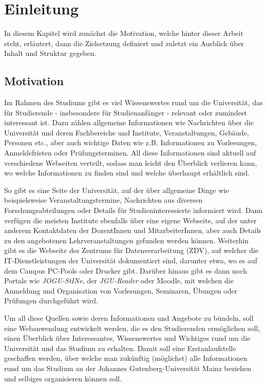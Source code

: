 %
\chapter{Einleitung}
\label{sec:intro}

In diesem Kapitel wird zunächst die Motivation, welche hinter dieser Arbeit steht, erläutert, dann die Zielsetzung definiert und zuletzt ein Ausblick über Inhalt und Struktur gegeben.

\label{sec:intro:motivation}
\section{Motivation}

Im Rahmen des Studiums gibt es viel Wissenswertes rund um die Universität, das für Studierende - insbesondere für Studienanfänger - relevant oder zumindest interessant ist. Dazu zählen allgemeine Informationen wie Nachrichten über die Universität und deren Fachbereiche und Institute, Veranstaltungen, Gebäude, Personen etc., aber auch wichtige Daten wie z.B. Informationen zu Vorlesungen, Anmeldefristen oder Prüfungsterminen. All diese Informationen sind aktuell auf verschiedene Webseiten verteilt, sodass man leicht den Überblick verlieren kann, wo welche Informationen zu finden sind und welche überhaupt erhältlich sind.

So gibt es eine Seite der Universität, auf der über allgemeine Dinge wie beispielsweise Veranstaltungstermine, Nachrichten aus diversen Forschungsabteilungen oder Details für Studieninteressierte informiert wird. Dann verfügen die meisten Institute ebenfalls über eine eigene Webseite, auf der unter anderem Kontaktdaten der DozentInnen und MitarbeiterInnen, aber auch Details zu den angebotenen Lehrveranstaltungen gefunden werden können. Weiterhin gibt es die Webseite des Zentrums für Datenverarbeitung (ZDV), auf welcher die IT-Dienstleistungen der Universität dokumentiert sind, darunter etwa, wo es auf dem Campus PC-Pools oder Drucker gibt. Darüber hinaus gibt es dann noch Portale wie \textit{JOGU-StINe}, der \textit{JGU-Reader} oder Moodle, mit welchen die Anmeldung und Organisation von Vorlesungen, Seminaren, Übungen oder Prüfungen durchgeführt wird.

Um all diese Quellen sowie deren Informationen und Angebote zu bündeln, soll eine Webanwendung entwickelt werden, die es den Studierenden ermöglichen soll, einen Überblick über Interessantes, Wissenswertes und Wichtiges rund um die Universität und das Studium zu erhalten. Damit soll eine Erstanlaufstelle geschaffen werden, über welche man zukünftig (möglichst) alle Informationen rund um das Studium an der Johannes Gutenberg-Universität Mainz beziehen und selbiges organisieren können soll.

